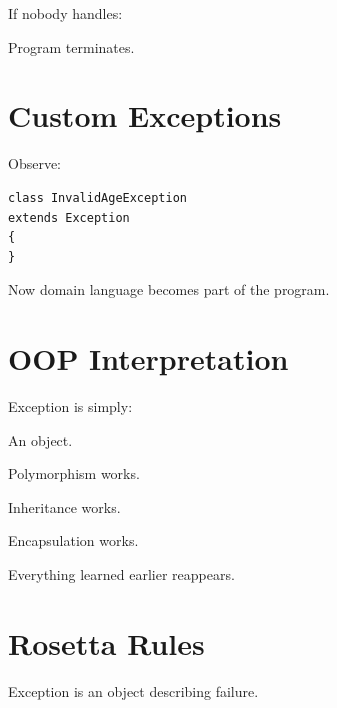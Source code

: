 \documentclass[11pt,a4paper]{book}
\begin{document}
If nobody handles:


Program terminates.


\section{Custom Exceptions}

Observe:

\begin{verbatim} 
class InvalidAgeException
extends Exception
{
}
\end{verbatim}


Now domain language becomes
part of the program.


\section{OOP Interpretation}

Exception is simply:


An object.


Polymorphism works.


Inheritance works.


Encapsulation works.


Everything learned earlier
reappears.


\section{Rosetta Rules}

\begin{rosettarule}

Exception is an object describing failure.

\end{rosettarule}
\end{document}
